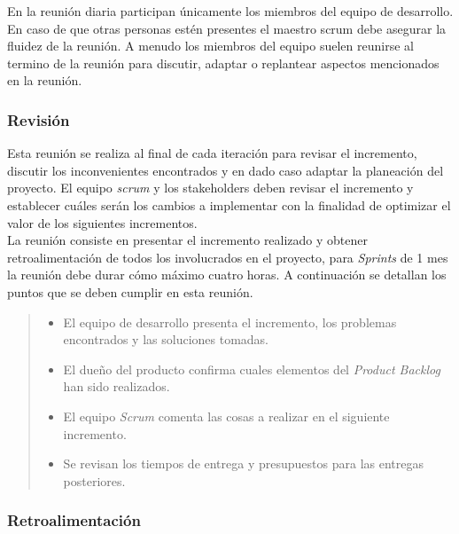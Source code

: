  \noindent En la reunión diaria participan únicamente los miembros del equipo de desarrollo. En
 caso de que otras personas estén presentes el maestro scrum debe asegurar la fluidez de la reunión.
 A menudo los miembros del equipo suelen reunirse al termino de la reunión para discutir, adaptar
 o replantear aspectos mencionados en la reunión.

\subsubsection{Revisión}

 Esta reunión se realiza al final de cada iteración para revisar el incremento,
 discutir los inconvenientes encontrados y en dado caso adaptar la planeación del
 proyecto. El equipo {\it scrum} y los stakeholders deben revisar el incremento
 y establecer cuáles serán los cambios a implementar con la finalidad de optimizar
 el valor de los siguientes incrementos.\\

 \noindent La reunión consiste en presentar el incremento realizado y obtener retroalimentación de
 todos los involucrados en el proyecto, para {\it Sprints} de 1 mes la reunión debe durar cómo
 máximo cuatro horas. A continuación se detallan los puntos que se deben cumplir en esta reunión.

    \begin{quote}
    \begin{itemize}
    \item El equipo de desarrollo presenta el incremento, los problemas encontrados y las
            soluciones tomadas.

    \item El dueño del producto confirma cuales elementos del {\it Product Backlog} han sido
            realizados.

    \item El equipo {\it Scrum} comenta las cosas a realizar en el siguiente incremento.

    \item Se revisan los tiempos de entrega y presupuestos para las entregas posteriores.
    \end{itemize}
    \end{quote}


\subsubsection{Retroalimentación}

